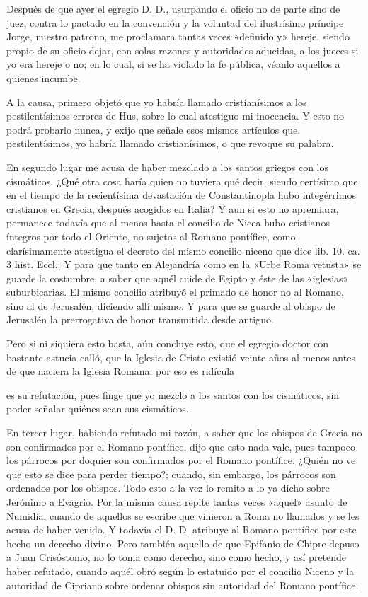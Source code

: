 Después de que ayer el egregio D. D., usurpando el oficio no de parte sino de juez, contra lo pactado en la convención y la voluntad del ilustrísimo príncipe Jorge, nuestro patrono, me proclamara tantas veces «definido y» hereje, siendo propio de su oficio dejar, con solas razones y autoridades aducidas, a los jueces si yo era hereje o no; en lo cual, si se ha violado la fe pública, véanlo aquellos a quienes incumbe.

A la causa, primero objetó que yo habría llamado cristianísimos a los pestilentísimos errores de Hus, sobre lo cual atestiguo mi inocencia. Y esto no podrá probarlo nunca, y exijo que señale esos mismos artículos que, pestilentísimos, yo habría llamado cristianísimos, o que revoque su palabra.

En segundo lugar me acusa de haber mezclado a los santos griegos con los cismáticos. ¿Qué otra cosa haría quien no tuviera qué decir, siendo certísimo que en el tiempo de la recientísima devastación de Constantinopla hubo integérrimos cristianos en Grecia, después acogidos en Italia? Y aun si esto no apremiara, permanece todavía que al menos hasta el concilio de Nicea hubo cristianos íntegros por todo el Oriente, no sujetos al Romano pontífice, como clarísimamente atestigua el decreto del mismo concilio niceno que dice lib. 10. ca. 3 hist. Eccl.: Y para que tanto en Alejandría como en la «Urbe Roma vetusta» se guarde la costumbre, a saber que aquél cuide de Egipto y éste de las «iglesias» suburbicarias. El mismo concilio atribuyó el primado de honor no al Romano, sino al de Jerusalén, diciendo allí mismo: Y para que se guarde al obispo de Jerusalén la prerrogativa de honor transmitida desde antiguo.

Pero si ni siquiera esto basta, aún concluye esto, que el egregio doctor con bastante astucia calló, que la Iglesia de Cristo existió veinte años al menos antes de que naciera la Iglesia Romana: por eso es ridícula

es su refutación, pues finge que yo mezclo a los santos con los cismáticos, sin poder señalar quiénes sean sus cismáticos.

En tercer lugar, habiendo refutado mi razón, a saber que los obispos de Grecia no son confirmados por el Romano pontífice, dijo que esto nada vale, pues tampoco los párrocos por doquier son confirmados por el Romano pontífice. ¿Quién no ve que esto se dice para perder tiempo?; cuando, sin embargo, los párrocos son ordenados por los obispos. Todo esto a la vez lo remito a lo ya dicho sobre Jerónimo a Evagrio. Por la misma causa repite tantas veces «aquel» asunto de Numidia, cuando de aquellos se escribe que vinieron a Roma no llamados y se les acusa de haber venido. Y todavía el D. D. atribuye al Romano pontífice por este hecho un derecho divino. Pero también aquello de que Epifanio de Chipre depuso a Juan Crisóstomo, no lo toma como derecho, sino como hecho, y así pretende haber refutado, \marginpar{\small[286]} cuando aquél obró según lo estatuido por el concilio Niceno y la autoridad de Cipriano sobre ordenar obispos sin autoridad del Romano pontífice.

